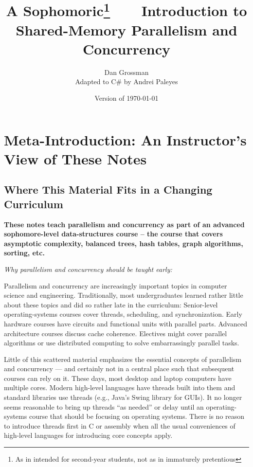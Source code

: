 \documentclass[10pt]{article}
\title{A Sophomoric\footnote{As in intended for second-year students,
    not as in immaturely pretentious}\ \ \ \ Introduction to\\ Shared-Memory
    Parallelism and Concurrency}
\author{Dan Grossman\\
Adapted to C\# by Andrei Paleyes}
\date{Version of \today}
\begin{document}
\maketitle

\newpage

\setcounter{tocdepth}{2}
\tableofcontents

\section{Meta-Introduction: An Instructor's View of These Notes}
\label{sec:meta-intro}

\subsection{Where This Material Fits in a Changing Curriculum}

\medskip
\noindent \textbf{These notes teach parallelism and concurrency as part of an
  advanced sophomore-level data-structures course -- the course that
  covers asymptotic complexity, balanced trees, hash tables, graph
  algorithms, sorting, etc.}
\medskip

\medskip
\noindent \emph{Why parallelism and concurrency should be taught early:}
\medskip

Parallelism and concurrency are increasingly important topics in
computer science and engineering.  Traditionally, most undergraduates
learned rather little about these topics and did so rather late in the
curriculum: Senior-level operating-systems courses cover threads,
scheduling, and synchronization.  Early hardware courses have circuits
and functional units with parallel parts.  Advanced architecture
courses discuss cache coherence.  Electives might cover parallel
algorithms or use distributed computing to solve embarrassingly
parallel tasks.

Little of this scattered material emphasizes the essential concepts of
parallelism and concurrency --- and certainly not in a central place
such that subsequent courses can rely on it.  These days, most desktop
and laptop computers have multiple cores.  Modern high-level languages
have threads built into them and standard libraries use threads (e.g.,
Java's Swing library for GUIs).  It no longer seems reasonable to
bring up threads ``as needed'' or delay until an operating-systems
course that should be focusing on operating systems.  There is no
reason to introduce threads first in C or assembly when all the usual
conveniences of high-level languages for introducing core concepts
apply.
\end{document}
